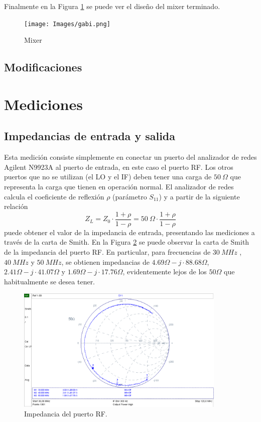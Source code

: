 \documentclass[a4paper,10pt]{article}
\begin{document}
	Finalmente en la Figura \ref{ecuadorputa} se puede ver el dise\~no del mixer terminado. 
	
		\begin{figure}[!htb]
			\centering
			\texttt{[image: Images/gabi.png]}
			\caption{Mixer}
			\label{ecuadorputa}
		\end{figure}
	\subsection{Modificaciones}
	\section{Mediciones}
	\subsection{Impedancias de entrada y salida}
	Esta medici\'on consiste simplemente en conectar un puerto del analizador de redes Agilent N9923A al puerto de entrada, en este caso el puerto RF. Los otros puertos que no se utilizan (el LO y el IF) deben tener una carga de $50~\Omega$ que representa la carga que tienen en operaci\'on normal.
	El analizador de redes calcula el coeficiente de reflexi\'on $\rho$ (par\'ametro $S_{11}$) y a partir de la siguiente relaci\'on
	$$Z_L =Z_0\cdot\frac{1+\rho}{1-\rho}=50~\Omega\cdot\frac{1+\rho}{1-\rho}$$
	puede obtener el valor de la impedancia de entrada, presentando las mediciones a trav\'es de la carta de Smith.
	En la Figura \ref{impedancia1} se puede observar la carta de Smith de la impedancia del puerto RF. En particular, para  frecuencias de $30~MHz$
, $40~MHz$ y $50~MHz$, se obtienen impedancias de $4.69\Omega-j\cdot88.68\Omega$, $2.41\Omega-j\cdot41.07\Omega$ y $1.69\Omega-j\cdot17.76\Omega$, evidentemente lejos de los $50\Omega$ que habitualmente se desea tener.	
	\begin{figure}[!htb]
		\centering
		\includegraphics[width=10cm]{Images/impedanciaRF.png}
		\caption{Impedancia del puerto RF.}
		\label{impedancia1}
	\end{figure}
	
\end{document}
